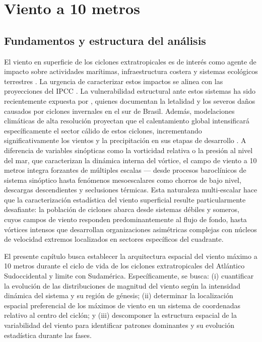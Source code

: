 \chapter{Viento a 10 metros}\label{cap:resultados_wind10}

\section{Fundamentos y estructura del análisis}\label{sec:intro_wind10}

El viento en superficie de los ciclones extratropicales es de interés como agente de impacto sobre actividades marítimas, infraestructura costera y sistemas ecológicos terrestres \citep{gramcianinov2023impact}. 
La urgencia de caracterizar estos impactos se alinea con las proyecciones del IPCC \citep{masson2022tendencias}. 
La vulnerabilidad estructural ante estos sistemas ha sido recientemente expuesta por \citet{bartolomei2024extremos}, quienes documentan la letalidad y los severos daños causados por ciclones invernales en el sur de Brasil. 
Además, modelaciones climáticas de alta resolución proyectan que el calentamiento global intensificará específicamente el sector cálido de estos ciclones, incrementando significativamente los vientos y la precipitación en sus etapas de desarrollo \citep{gentile2025response}. 
A diferencia de variables sinópticas como la vorticidad relativa o la presión al nivel del mar, que caracterizan la dinámica interna del vórtice, el campo de viento a 10 metros integra forzantes de múltiples escalas — desde procesos baroclínicos de sistema sinóptico hasta fenómenos mesoescalares como chorros de bajo nivel, descargas descendientes y seclusiones térmicas. 
Esta naturaleza multi-escalar hace que la caracterización estadística del viento superficial resulte particularmente desafiante: la población de ciclones abarca desde sistemas débiles y someros, cuyos campos de viento responden predominantemente al flujo de fondo, hasta vórtices intensos que desarrollan organizaciones asimétricas complejas con núcleos de velocidad extremos localizados en sectores específicos del cuadrante.

El presente capítulo busca establecer la arquitectura espacial del viento máximo a 10 metros durante el ciclo de vida de los ciclones extratropicales del Atlántico Sudoccidental y limite con Sudamérica. 
Específicamente, se busca: (i) cuantificar la evolución de las distribuciones de magnitud del viento según la intensidad dinámica del sistema y su región de génesis; (ii) determinar la localización espacial preferencial de los máximos de viento en un sistema de coordenadas relativo al centro del ciclón; y (iii) descomponer la estructura espacial de la variabilidad del viento para identificar patrones dominantes y su evolución estadística durante las fases.

